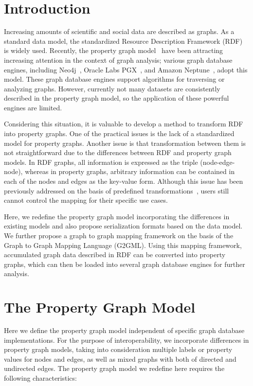 \documentclass[runningheads]{llncs}
\begin{document}
\section{Introduction}

Increasing amounts of scientific and social data are described as graphs. 
As a standard data model, the standardized Resource Description Framework (RDF)~\cite{rdf} is widely used. 
Recently, the property graph model~\cite{angles1,angles2} have been attracting increasing attention in the context of graph analysis; various graph database engines, including Neo4j~\cite{neo4j}, Oracle Labs PGX~\cite{pgx}, and Amazon Neptune~\cite{neptune}, adopt this model. These graph database engines support algorithms for traversing or analyzing graphs. However, currently not many datasets are consistently described in the property graph model, so the application of these powerful engines are limited.

Considering this situation, it is valuable to develop a method to transform RDF into property graphs. One of the practical issues is the lack of a standardized model for property graphs. 
Another issue is that transformation between them is not straightforward due to the differences between RDF and property graph models. 
In RDF graphs, all information is expressed as the triple (node-edge-node), whereas in property graphs, arbitrary information can be contained in each of the nodes and edges as the key-value form. 
Although this issue has been previously addressed on the basis of predefined transformations~\cite{hartig},
users still cannot control the mapping for their specific use cases.

Here, we redefine the property graph model incorporating the differences in existing models and also propose serialization formats based on the data model. We further propose a graph to graph mapping framework on the basis of the Graph to Graph Mapping Language (G2GML). Using this mapping framework, accumulated graph data described in RDF can be converted into property graphs, which can then be loaded into several graph database engines for further analysis. 


\section{The Property Graph Model}
Here we define the property graph model independent of specific graph database implementations. For the purpose of interoperability, we incorporate differences in property graph models, taking into consideration multiple labels or property values for nodes and edges, as well as mixed graphs with both of directed and undirected edges. The property graph model we redefine here requires the following characteristics:
\end{document}
